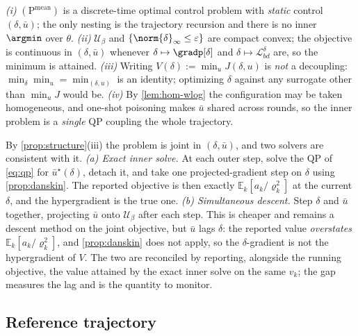 \begin{proposition}[Structure]
\label{prop:structure}
\emph{(i)} $(\mathrm{P}^{\mathrm{mean}})$ is a discrete-time optimal control problem with \emph{static} control $(\delta,\bar u)$; the only nesting is the trajectory recursion and there is no inner $\argmin$ over $\theta$.
\emph{(ii)} $\mathcal{U}_\beta$ and $\{\norm{\delta}_\infty\le\varepsilon\}$ are compact convex; the objective is continuous in $(\delta,\bar u)$ whenever $\delta\mapsto\gradp[\delta]$ and $\delta\mapsto\mathcal{L}_{bd}^\delta$ are, so the minimum is attained.
\emph{(iii)} Writing $V(\delta):=\min_uJ(\delta,u)$ is \emph{not} a decoupling: $\min_\delta\min_u=\min_{(\delta,u)}$ is an identity; optimizing $\delta$ against any surrogate other than $\min_uJ$ would be.
\emph{(iv)} By \cref{lem:hom-wlog} the configuration may be taken homogeneous, and one-shot poisoning makes $\bar u$ shared across rounds, so the inner problem is a \emph{single} QP coupling the whole trajectory.
\end{proposition}

\begin{remark}
\label{rem:solver}
By \cref{prop:structure}(iii) the problem is joint in $(\delta,\bar u)$, and two solvers are
consistent with it.
\emph{(a) Exact inner solve.} At each outer step, solve the QP of \cref{eq:qp} for
$\bar u^\star(\delta)$, detach it, and take one projected-gradient step on $\delta$ using
\cref{prop:danskin}. The reported objective is then exactly $\mathbb{E}_k[a_k/\varrho_k^2]$ at
the current $\delta$, and the hypergradient is the true one.
\emph{(b) Simultaneous descent.} Step $\delta$ and $\bar u$ together, projecting $\bar u$ onto
$\mathcal{U}_\beta$ after each step. This is cheaper and remains a descent method on the joint
objective, but $\bar u$ lags $\delta$: the reported value \emph{overstates}
$\mathbb{E}_k[a_k/\varrho_k^2]$, and \cref{prop:danskin} does not apply, so the $\delta$-gradient
is not the hypergradient of $V$.
The two are reconciled by reporting, alongside the running objective, the value attained by the
exact inner solve on the same $v_k$; the gap measures the lag and is the quantity to monitor.
\end{remark}



\subsection{Reference trajectory}
\label{sec:ref-traj}

